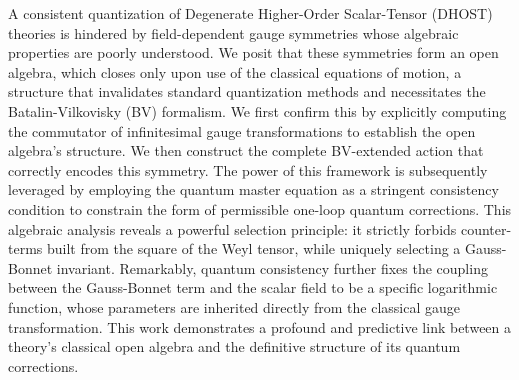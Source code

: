 \documentclass[twocolumn]{aastex631}
\begin{document}
A consistent quantization of Degenerate Higher-Order Scalar-Tensor (DHOST) theories is hindered by field-dependent gauge symmetries whose algebraic properties are poorly understood. We posit that these symmetries form an open algebra, which closes only upon use of the classical equations of motion, a structure that invalidates standard quantization methods and necessitates the Batalin-Vilkovisky (BV) formalism. We first confirm this by explicitly computing the commutator of infinitesimal gauge transformations to establish the open algebra's structure. We then construct the complete BV-extended action that correctly encodes this symmetry. The power of this framework is subsequently leveraged by employing the quantum master equation as a stringent consistency condition to constrain the form of permissible one-loop quantum corrections. This algebraic analysis reveals a powerful selection principle: it strictly forbids counter-terms built from the square of the Weyl tensor, while uniquely selecting a Gauss-Bonnet invariant. Remarkably, quantum consistency further fixes the coupling between the Gauss-Bonnet term and the scalar field to be a specific logarithmic function, whose parameters are inherited directly from the classical gauge transformation. This work demonstrates a profound and predictive link between a theory's classical open algebra and the definitive structure of its quantum corrections.
\end{document}

